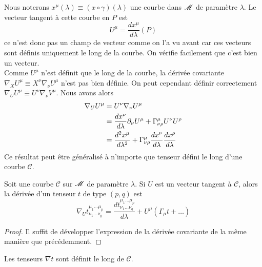 \documentclass[a4paper,11pt]{report}
\begin{document}
            Nous noterons $x^\mu(\lambda)\equiv (x\circ \gamma)(\lambda)$ une courbe dans $\mathscr{M}$ de paramètre $\lambda$. Le vecteur tangent à cette courbe en $P$ est
                \begin{equation}
                    U^\mu = \frac{dx^\mu}{d\lambda}(P)
                \end{equation}
            ce n'est donc pas un champ de vecteur comme on l'a vu avant car ces vecteurs sont définis uniquement le long de la courbe. On vérifie facilement que c'est bien un vecteur.\\
            
            Comme $U^\mu$ n'est définit que le long de la courbe, la dérivée covariante $\nabla_X U^\mu\equiv X^\nu\nabla_\nu U^\mu$ n'est pas bien définie. On peut cependant définir correctement $\nabla_U U^\mu\equiv U^\nu\nabla_\nu V^\mu$. Nous avons alors
            \begin{align}
                \nabla_U U^\mu &= U^\nu\nabla_\nu U^\mu \\
                &= \frac{dx^\nu}{d\lambda}\partial_\nu U^\mu + \Gamma^\mu_{\nu\rho}U^\nu U^\rho \\
                &= \frac{d^2x^\mu}{d\lambda^2} + \Gamma^\mu_{\nu\rho} \frac{dx^\nu}{d\lambda}\frac{dx^\rho}{d\lambda}
            \end{align}
            Ce résultat peut être généralisé à n'importe que tenseur défini le long d'une courbe $\mathscr{C}$.
            \begin{prop}\begin{leftbar}
                Soit une courbe $\mathscr{C}$ sur $\mathscr{M}$ de paramètre $\lambda$. Si $U$ est un vecteur tangent à $\mathscr{C}$, alors la dérivée d'un tenseur $t$ de type $(p,q)$ est
                \begin{equation}
                    \nabla_U t^{\mu_1\dots\mu_p}_{\nu_1\dots\nu_q} = \frac{dt^{\mu_1\dots\mu_p}_{\nu_1\dots\nu_q}}{d\lambda} + U^\mu(\Gamma_\mu t + \dots)
                \end{equation}
            \end{leftbar}\end{prop}
            
            \begin{proof}
                Il suffit de développer l'expression de la dérivée covariante de la même manière que précédemment.
            \end{proof}
            
            Les tenseurs $\nabla t$ sont définit le long de $\mathscr{C}$.\\
            
\end{document}
